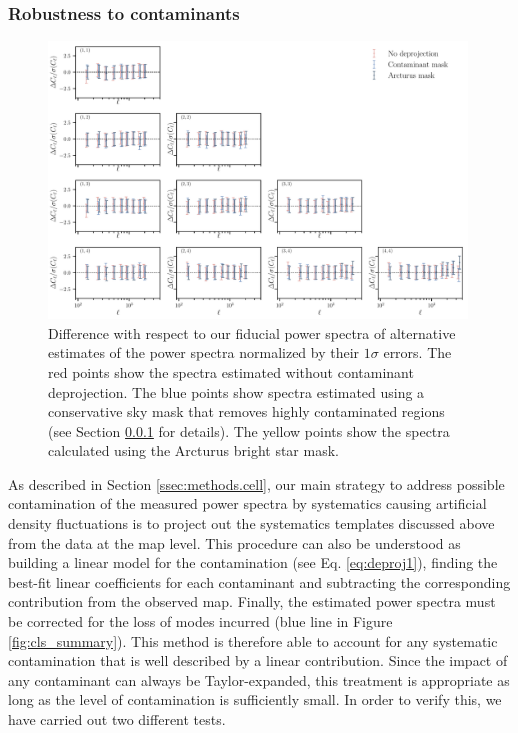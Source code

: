 \documentclass[a4paper,11pt]{article}
\begin{document}
    \subsubsection{Robustness to contaminants} \label{sssec:results.spectra.syst}
      \begin{figure}
        \centering
        \includegraphics[width=0.99\textwidth]{figures/cls_systematics.pdf}
        \caption{Difference with respect to our fiducial power spectra of alternative estimates of the power spectra normalized by their $1\sigma$ errors. The red points show the spectra estimated without contaminant deprojection. The blue points show spectra estimated using a conservative sky mask that removes highly contaminated regions (see Section \ref{sssec:results.spectra.syst} for details). The yellow points show the spectra calculated using the Arcturus bright star mask.}
        \label{fig:cls_systematics}
      \end{figure}
      As described in Section \ref{ssec:methods.cell}, our main strategy to address possible contamination of the measured power spectra by systematics causing artificial density fluctuations is to project out the systematics templates discussed above from the data at the map level. This procedure can also be understood as building a linear model for the contamination (see Eq. \ref{eq:deproj1}), finding the best-fit linear coefficients for each contaminant and subtracting the corresponding contribution from the observed map. Finally, the estimated power spectra must be corrected for the loss of modes incurred (blue line in Figure \ref{fig:cls_summary}). This method is therefore able to account for any systematic contamination that is well described by a linear contribution. Since the impact of any contaminant can always be Taylor-expanded, this treatment is appropriate as long as the level of contamination is sufficiently small. In order to verify this, we have carried out two different tests.
      
\end{document}
